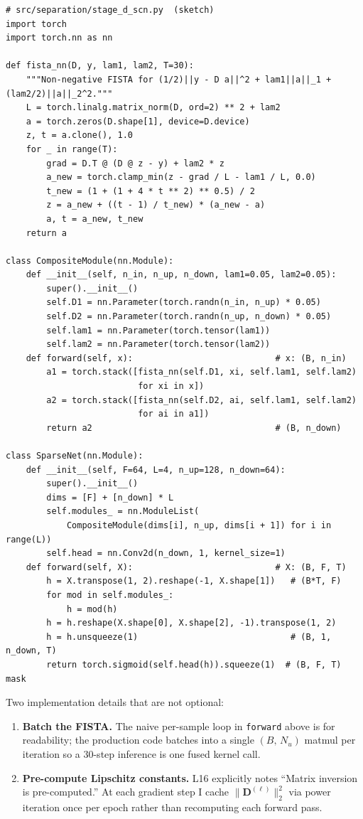 \documentclass[10pt]{article}
\begin{document}
\begin{lstlisting}
# src/separation/stage_d_scn.py  (sketch)
import torch
import torch.nn as nn

def fista_nn(D, y, lam1, lam2, T=30):
    """Non-negative FISTA for (1/2)||y - D a||^2 + lam1||a||_1 + (lam2/2)||a||_2^2."""
    L = torch.linalg.matrix_norm(D, ord=2) ** 2 + lam2
    a = torch.zeros(D.shape[1], device=D.device)
    z, t = a.clone(), 1.0
    for _ in range(T):
        grad = D.T @ (D @ z - y) + lam2 * z
        a_new = torch.clamp_min(z - grad / L - lam1 / L, 0.0)
        t_new = (1 + (1 + 4 * t ** 2) ** 0.5) / 2
        z = a_new + ((t - 1) / t_new) * (a_new - a)
        a, t = a_new, t_new
    return a

class CompositeModule(nn.Module):
    def __init__(self, n_in, n_up, n_down, lam1=0.05, lam2=0.05):
        super().__init__()
        self.D1 = nn.Parameter(torch.randn(n_in, n_up) * 0.05)
        self.D2 = nn.Parameter(torch.randn(n_up, n_down) * 0.05)
        self.lam1 = nn.Parameter(torch.tensor(lam1))
        self.lam2 = nn.Parameter(torch.tensor(lam2))
    def forward(self, x):                            # x: (B, n_in)
        a1 = torch.stack([fista_nn(self.D1, xi, self.lam1, self.lam2)
                          for xi in x])
        a2 = torch.stack([fista_nn(self.D2, ai, self.lam1, self.lam2)
                          for ai in a1])
        return a2                                    # (B, n_down)

class SparseNet(nn.Module):
    def __init__(self, F=64, L=4, n_up=128, n_down=64):
        super().__init__()
        dims = [F] + [n_down] * L
        self.modules_ = nn.ModuleList(
            CompositeModule(dims[i], n_up, dims[i + 1]) for i in range(L))
        self.head = nn.Conv2d(n_down, 1, kernel_size=1)
    def forward(self, X):                            # X: (B, F, T)
        h = X.transpose(1, 2).reshape(-1, X.shape[1])   # (B*T, F)
        for mod in self.modules_:
            h = mod(h)
        h = h.reshape(X.shape[0], X.shape[2], -1).transpose(1, 2)
        h = h.unsqueeze(1)                              # (B, 1, n_down, T)
        return torch.sigmoid(self.head(h)).squeeze(1)  # (B, F, T) mask
\end{lstlisting}

Two implementation details that are not optional:
\begin{enumerate}
\item \textbf{Batch the FISTA.} The naive per-sample loop in
\texttt{forward} above is for readability; the production code batches
into a single $(B,\,N_u)$ matmul per iteration so a 30-step inference is
one fused kernel call.
\item \textbf{Pre-compute Lipschitz constants.} L16 explicitly notes
``Matrix inversion is pre-computed.''  At each gradient step I cache
$\|\bm{D}^{(\ell)}\|_2^2$ via power iteration once per epoch rather than
recomputing each forward pass.
\end{enumerate}
\end{document}
